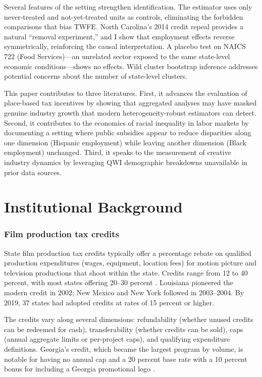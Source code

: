 \documentclass[12pt]{article}
\begin{document}
Several features of the setting strengthen identification. The \citet{CallawayS2021} estimator uses only never-treated and not-yet-treated units as controls, eliminating the forbidden comparisons that bias TWFE. North Carolina's 2014 credit repeal provides a natural ``removal experiment,'' and I show that employment effects reverse symmetrically, reinforcing the causal interpretation. A placebo test on NAICS 722 (Food Services)---an unrelated sector exposed to the same state-level economic conditions---shows no effects. Wild cluster bootstrap inference addresses potential concerns about the number of state-level clusters.

This paper contributes to three literatures. First, it advances the evaluation of place-based tax incentives \citep{Neumark2015, Slattery2020, Button2019} by showing that aggregated analyses may have masked genuine industry growth that modern heterogeneity-robust estimators can detect. Second, it contributes to the economics of racial inequality in labor markets \citep{Lang2020, Bertrand2004} by documenting a setting where public subsidies appear to reduce disparities along one dimension (Hispanic employment) while leaving another dimension (Black employment) unchanged. Third, it speaks to the measurement of creative industry dynamics \citep{Florida2002, Moretti2019} by leveraging QWI demographic breakdowns unavailable in prior data sources.

\section{Institutional Background}

\subsubsection*{Film production tax credits} State film production tax credits typically offer a percentage rebate on qualified production expenditures (wages, equipment, location fees) for motion picture and television productions that shoot within the state. Credits range from 12 to 40 percent, with most states offering 20--30 percent \citep{Thom2018}. Louisiana pioneered the modern credit in 2002; New Mexico and New York followed in 2003--2004. By 2019, 37 states had adopted credits at rates of 15 percent or higher.

The credits vary along several dimensions: refundability (whether unused credits can be redeemed for cash), transferability (whether credits can be sold), caps (annual aggregate limits or per-project caps), and qualifying expenditure definitions. Georgia's credit, which became the largest program by volume, is notable for having no annual cap and a 20 percent base rate with a 10 percent bonus for including a Georgia promotional logo \citep{Thom2018}.
\end{document}
